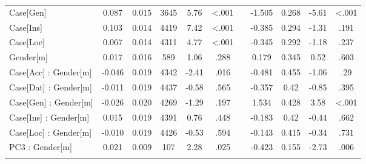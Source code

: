 \documentclass[output=paper, modfonts,newtxmath,hidelinks]{langscibook}
\begin{document}
\begin{sidewaystable}
\begin{tabularx}{\textwidth}{l SS S[table-format=4.0] SS  X *{4}{S}}
 Case[Gen]             & 0.087  & 0.015 & 3645 & 5.76   &  <.001 & & -1.505   & 0.268 & -5.61  & <.001\\
 Case[Ins]             & 0.103  & 0.014 & 4419 & 7.42   &  <.001 & &   -0.385 & 0.294 & -1.31  & .191\\
 Case[Loc]             & 0.067  & 0.014 & 4311 & 4.77   &  <.001 & & -0.345   & 0.292 & -1.18  & .237\\
 Gender[m]             & 0.017  & 0.016 & 589  & 1.06   &  .288  & &  0.179   & 0.345 & 0.52   & .603\\
 Case[Acc] : Gender[m] & -0.046 & 0.019 & 4342 & -2.41  &  .016  & & -0.481   & 0.455 & -1.06  & .29\\
 Case[Dat] : Gender[m] & -0.011 & 0.019 & 4437 & -0.58  &  .565  & & -0.357   & 0.42  & -0.85  & .395\\
 Case[Gen] : Gender[m] & -0.026 & 0.020 & 4269 & -1.29  &  .197  & & 1.534    & 0.428 & 3.58   & <.001\\
 Case[Ins] : Gender[m] & 0.015  & 0.019 & 4391 & 0.76   &  .448  & & -0.183   & 0.42  & -0.44  & .662\\
 Case[Loc] : Gender[m] & -0.010 & 0.019 & 4426 & -0.53  &  .594  & & -0.143   & 0.415 & -0.34  & .731\\
 PC3 : Gender[m]       & 0.021  & 0.009 & 107  & 2.28   &  .025  & & -0.423   & 0.155 & -2.73  & .006\\
   \lspbottomrule
 \end{tabularx}    
\end{sidewaystable}
\end{document}
